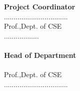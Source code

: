 \begin{titlepage}
 \hfill  {\bf Project Coordinator} \\[.3cm]
\noindent \vguide \hfill .................................\\  Prof.,Dept. of CSE  \\.................. \\   \hfill  \\\hspace*{\fill} {\bf Head of Department}\noindent  \\\hspace*{\fill} \hfill\vhod  \\\hspace*{\fill}\hfill  Prof.,Dept. of CSE \\\hspace*{\fill}
\hfill .................................\\ 



%
\end{titlepage}

%  